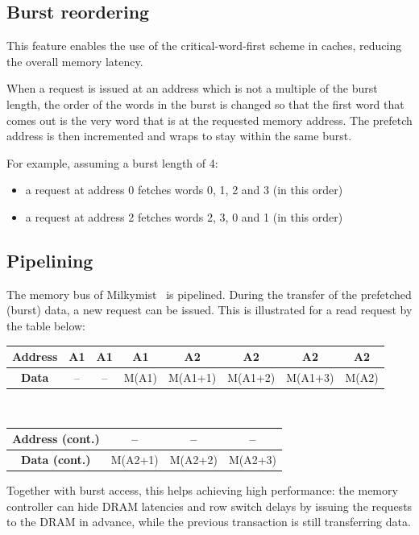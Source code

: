 \documentclass[a4paper,11pt]{kthesis}
\begin{document}
\subsection{Burst reordering}
\label{subsec:fmlborder}
This feature enables the use of the critical-word-first scheme in caches, reducing the overall memory latency.

When a request is issued at an address which is not a multiple of the burst length, the order of the words in the burst is changed so that the first word that comes out is the very word that is at the requested memory address. The prefetch address is then incremented and wraps to stay within the same burst.

For example, assuming a burst length of 4:
\begin{itemize}
\item a request at address 0 fetches words 0, 1, 2 and 3 (in this order)
\item a request at address 2 fetches words 2, 3, 0 and 1 (in this order)
\end{itemize}

\subsection{Pipelining}
\label{subsec:fmlpipe}
The memory bus of Milkymist~\cite{fml} is pipelined. During the transfer of the prefetched (burst) data, a new request can be issued. This is illustrated for a read request by the table below:

\begin{tabular}{|c|c|c|c|c|c|c|c|}
\hline
\textbf{Address} & A1 & A1 & A1 & A2 & A2 & A2 & A2 \\
\hline
\textbf{Data} & -- & -- & M(A1) & M(A1+1) & M(A1+2) & M(A1+3) & M(A2) \\
\hline
\end{tabular}\\

\begin{tabular}{|c|c|c|c|}
\hline
\textbf{Address (cont.)} & -- & -- & --\\
\hline
\textbf{Data (cont.)} & M(A2+1) & M(A2+2) & M(A2+3) \\
\hline
\end{tabular}

Together with burst access, this helps achieving high performance: the memory controller can hide DRAM latencies and row switch delays by issuing the requests to the DRAM in advance, while the previous transaction is still transferring data.
\end{document}
